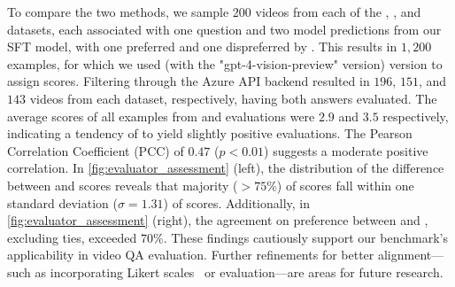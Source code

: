 To compare the two methods, we sample $200$ videos from each of the \webvid, \vidal, and \actnet datasets, each associated with one question and two model predictions from our SFT model, with one preferred and one dispreferred by \chatgpt. This results in $1,200$ examples, for which we used \gptv (with the "gpt-4-vision-preview" version) version to assign scores. Filtering through the Azure API backend resulted in $196$, $151$, and $143$ videos from each dataset, respectively, having both answers evaluated. The average scores of all examples from \chatgpt and \gptv evaluations were $2.9$ and $3.5$ respectively, indicating a tendency of \gptv to yield slightly positive evaluations. The Pearson Correlation Coefficient (PCC) of $0.47$ ($p<0.01$) suggests a moderate positive correlation. In \cref{fig:evaluator_assessment} (left), the distribution of the difference between \chatgpt and \gptv scores reveals that majority ($>75\%$) of \chatgpt scores fall within one standard deviation ($\sigma=1.31$) of \gptv scores. Additionally, in \cref{fig:evaluator_assessment} (right), the agreement on preference between \chatgpt and \gptv, excluding ties, exceeded $70\%$. These findings cautiously support our benchmark's applicability in video QA evaluation. Further refinements for better alignment—such as incorporating Likert scales~\cite{zhou2023sotopia} or \gptf evaluation—are areas for future research.
